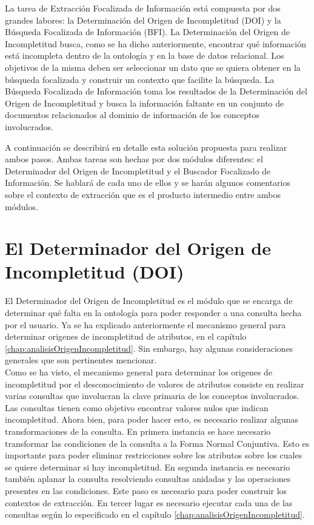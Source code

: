 La tarea de Extracción Focalizada de Información está compuesta por dos grandes labores: la Determinación del Origen de Incompletitud (DOI) y la Búsqueda Focalizada de Información (BFI). La Determinación del Origen de Incompletitud busca, como se ha dicho anteriormente, encontrar qué información está incompleta dentro de la ontología y en la base de datos relacional. Los objetivos de la misma deben ser seleccionar un dato que se quiera obtener en la búsqueda focalizada y construir un contexto que facilite la búsqueda.  La Búsqueda Focalizada de Información toma los resultados de la Determinación del Origen de Incompletitud y busca la información faltante en un conjunto de documentos relacionados al dominio de información de los conceptos involucrados. 

A continuación se describirá en detalle esta solución propuesta para realizar ambos pasos. Ambas tareas son hechas por dos módulos diferentes: el Determinador del Origen de Incompletitud y el Buscador Focalizado de Información. Se hablará de cada uno de ellos y se harán algunos comentarios sobre el contexto de extracción que es el producto intermedio entre ambos módulos. \\

\section{El Determinador del Origen de Incompletitud (DOI)}\label{sect:diseno-DOI}

El Determinador del Origen de Incompletitud es el módulo que se encarga de determinar qué falta en la ontología para poder responder a una consulta hecha por el usuario. Ya se ha explicado anteriormente el mecanismo general para determinar origenes de incompletitud de atributos, en el capítulo \ref{chap:analisisOrigenIncompletitud}. Sin embargo, hay algunas consideraciones generales que son pertinentes mencionar. \\

Como se ha visto, el mecanismo general para determinar los origenes de incompletitud por el desconocimiento de valores de atributos consiste en realizar varias consultas que involucran la clave primaria de los conceptos involucrados. Las consultas tienen como objetivo encontrar valores nulos que indican incompletitud. Ahora bien, para poder hacer esto, es necesario realizar algunas transformaciones de la consulta. En primera instancia se hace necesario transformar las condiciones de la consulta a la Forma Normal Conjuntiva. Esto es importante para poder eliminar restricciones sobre los atributos sobre los cuales se quiere determinar si hay incompletitud. En segunda instancia es necesario también aplanar la consulta resolviendo consultas anidadas y las operaciones presentes en las condiciones. Este paso es necesario para poder construir los contextos de extracción. En tercer lugar es necesario ejecutar cada una de las consultas según lo especificado en el capítulo \ref{chap:analisisOrigenIncompletitud}. \\

